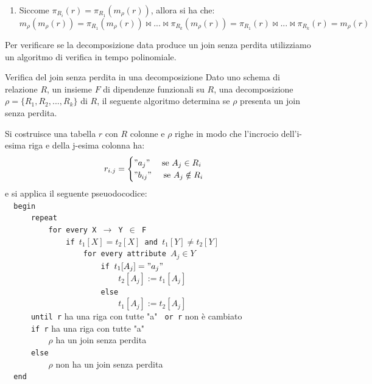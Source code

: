 \begin{Thm}{}{}
\begin{demonstration}
\begin{enumerate}[label=(\alph*)]
        \item Siccome $\pi_{R_i}(r) = \pi_{R_1}(m_\rho (r))$, allora si ha che:
        \begin{equation*}
            m_\rho (m_\rho (r)) = \pi_{R_1}(m_\rho (r)) \bowtie ... \bowtie \pi_{R_k}(m_\rho (r)) = \pi_{R_1}(r) \bowtie ... \bowtie \pi_{R_k}(r) = m_\rho (r)
        \end{equation*}
        \end{enumerate}
    \end{demonstration}
\end{Thm}

Per verificare se la decomposizione data produce un join senza perdita utilizziamo un algoritmo di verifica in tempo polinomiale.

\begin{Algoritmo}{Verifica del join senza perdita in una decomposizione}{}
    Dato uno schema di relazione $R$, un insieme $F$ di dipendenze funzionali su $R$, una decomposizione $\rho=\{R_1, R_2,...,R_k\}$ di $R$, il seguente algoritmo determina se $\rho$ presenta un join senza perdita.

    Si costruisce una tabella $r$ con $R$ colonne e $\rho$ righe in modo che l'incrocio dell'i-esima riga e della j-esima colonna ha:
    \begin{equation*}r_{i.j}=
        \begin{cases}"a_j"\hspace{0.5cm}\mbox{se }A_j\in R_i\\ "b_{ij}"\hspace{0.5cm}\mbox{se }A_j\notin R_i\end{cases}
    \end{equation*}
    e si applica il seguente pseuodocodice:\\
    \verb|  begin|\\
    \verb|      repeat|\\
    \verb|          for every X |$\to$\verb| Y |$\in$\verb| F|\\
    \verb|              if |$t_1[X]=t_2[X]$\verb| and |$t_1[Y]\neq t_2[Y]$\\
    \verb|                  for every attribute |$A_j\in Y$\\
    \verb|                      if |$t_1[A_j]="a_j"$\\
    \verb|                          |$t_2[A_j]:=t_1[A_j]$\\
    \verb|                      else|\\
    \verb|                          |$t_1[A_j]:=t_2[A_j]$\\
    \verb|      until r| ha una riga con tutte "a" \verb| or r| non è cambiato\\
    \verb|      if r| ha una riga con tutte "a"\\
    \verb|          |$\rho$ ha un join senza perdita\\
    \verb|      else|\\
    \verb|          |$\rho$ non ha un join senza perdita\\
    \verb|  end|


\end{Algoritmo}
